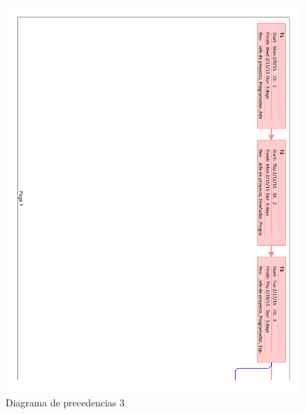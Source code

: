 \begin{figure}[!htbp]
	\centering
	\includegraphics[page=3, scale=.65]{fig/network_diagram}
	\caption{Diagrama de precedencias 3}
\end{figure}

